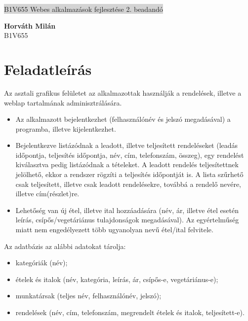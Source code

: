 \documentclass[11pt,a4paper]{article}
\begin{document}
	\renewcommand{\labelitemi}{\textbullet}
	\def\br{\\[0.1cm]}
	\thispagestyle{empty}
	\begin{center}
		\colorbox{lightgray}{{\large B1V655} \hspace{3cm} {\large Webes alkalmazások fejlesztése 2. beadandó} \hspace{5cm} \thepage}
	\end{center}
	\begin{framed}
		\begin{flushleft}
			{\large \textbf{Horváth Milán}}
			\hspace{5.4cm}{\large \today}\br
			{\large B1V655}
		\end{flushleft}
	\end{framed}
	\section{Feladatleírás}
	Az asztali grafikus felületet az alkalmazottak használják a rendelések, illetve a weblap tartalmának adminisztrálására.
	\begin{itemize}
		\item Az alkalmazott bejelentkezhet (felhasználónév és jelszó megadásával) a programba, illetve kijelentkezhet.
		\item Bejelentkezve listázódnak a leadott, illetve teljesített rendeléseket (leadás időpontja, teljesítés időpontja, név, cím, telefonszám, összeg), egy rendelést kiválasztva pedig listázódnak a tételeket. A leadott rendelés teljesítettnek jelölhető, ekkor a rendszer rögzíti a teljesítés időpontját is. A lista szűrhető csak teljesített, illetve csak leadott rendelésekre, továbbá a rendelő nevére, illetve cím(részlet)re.
		\item Lehetőség van új étel, illetve ital hozzáadására (név, ár, illetve étel esetén leírás, csípős/vegetáriánus tulajdonságok megadásával). Az egyértelműség miatt nem engedélyezett több ugyanolyan nevű étel/ital felvitele.
	\end{itemize}
	Az adatbázis az alábbi adatokat tárolja:
	\begin{itemize}
		\item kategóriák (név);
		\item ételek és italok (név, kategória, leírás, ár, csípős-e, vegetáriánus-e);
		\item munkatársak (teljes név, felhasználónév, jelszó);
		\item rendelések (név, cím, telefonszám, megrendelt ételek és italok, teljesített-e).
	\end{itemize}
\end{document}
